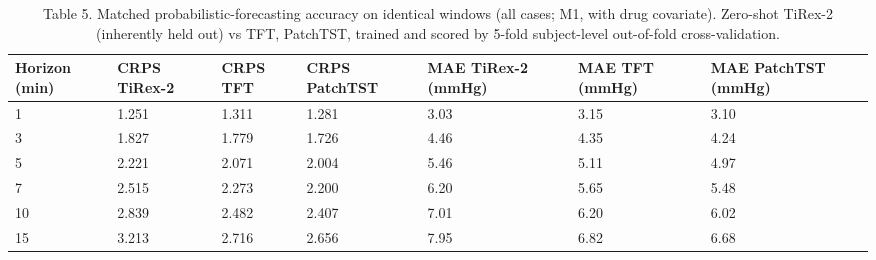 \begin{table}[t]\centering\footnotesize
\caption{Table 5. Matched probabilistic-forecasting accuracy on identical windows (all cases; M1, with drug covariate). Zero-shot TiRex-2 (inherently held out) vs TFT, PatchTST, trained and scored by 5-fold subject-level out-of-fold cross-validation.}
\begin{tabular}{lllllll}
\toprule
Horizon (min) & CRPS TiRex-2 & CRPS TFT & CRPS PatchTST & MAE TiRex-2 (mmHg) & MAE TFT (mmHg) & MAE PatchTST (mmHg) \\
\midrule
1 & 1.251 & 1.311 & 1.281 & 3.03 & 3.15 & 3.10 \\
3 & 1.827 & 1.779 & 1.726 & 4.46 & 4.35 & 4.24 \\
5 & 2.221 & 2.071 & 2.004 & 5.46 & 5.11 & 4.97 \\
7 & 2.515 & 2.273 & 2.200 & 6.20 & 5.65 & 5.48 \\
10 & 2.839 & 2.482 & 2.407 & 7.01 & 6.20 & 6.02 \\
15 & 3.213 & 2.716 & 2.656 & 7.95 & 6.82 & 6.68 \\
\bottomrule
\end{tabular}
\end{table}
